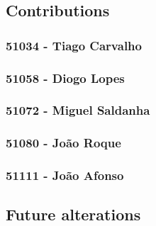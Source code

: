 \documentclass{article}
\begin{document}
    \subsection{Contributions}
    \label{sec:contributions}

      \subsubsection{51034 - Tiago Carvalho}
      \subsubsection{51058 - Diogo Lopes}
      \subsubsection{51072 - Miguel Saldanha}
      \subsubsection{51080 - João Roque}
      \subsubsection{51111 - João Afonso}

    \subsection{Future alterations}
    \label{sec:alterations}
\end{document}
